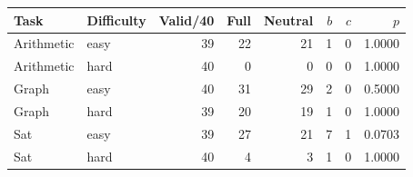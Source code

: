 \begin{tabular}{llrrrrrr}
\toprule
Task & Difficulty & Valid/40 & Full & Neutral & $b$ & $c$ & $p$ \\
\midrule
Arithmetic & easy & 39 & 22 & 21 & 1 & 0 & 1.0000 \\
Arithmetic & hard & 40 & 0 & 0 & 0 & 0 & 1.0000 \\
Graph & easy & 40 & 31 & 29 & 2 & 0 & 0.5000 \\
Graph & hard & 39 & 20 & 19 & 1 & 0 & 1.0000 \\
Sat & easy & 39 & 27 & 21 & 7 & 1 & 0.0703 \\
Sat & hard & 40 & 4 & 3 & 1 & 0 & 1.0000 \\
\bottomrule
\end{tabular}
